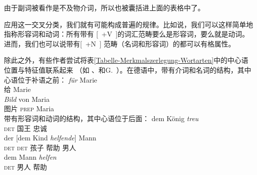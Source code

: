 \noindent
由于副词被看作是不及物介词\label{Seite-Adverbien-PP}，所以也被囊括进上面的表格中了。

应用这一交叉分类，我们就有可能构成普遍的规律。比如说，我们可以这样简单地指称形容词和动词：所有带有 [~+V~]的词汇范畴要么是形容词，要么就是动词。进而，我们也可以说带有[~+N~] 范畴（名词和形容词）的都可以有格属性。

除此之外，有些作者尝试将表\ref{Tabelle-Merkmalszerlegung-Wortarten}中的中心语位置与特征值联系起来
（如 \citealp[]{Grewendorf88a}、\citealp[]{Haftka96a}和G.\ \citealp[]{GMueller2011a}）。在德语中，带有介词和名词的结构，其中心语位于补语之前：
\eal
\ex
\gll \emph{für} Marie\\
	 给 Marie\\
\ex 
\gll \emph{Bild} von Maria\\
	 图片 \textsc{prep} Maria\\
\zl
带有形容词和动词的结构，其中心语位于后面：
\eal
\ex 
\gll dem König \emph{treu}\\
     \textsc{det} 国王 忠诚\\
\ex 
\gll der [dem Kind \emph{helfende}] Mann\\
     \textsc{det} \spacebr\textsc{det} 孩子 帮助 男人\\
\ex 
\gll dem Mann \emph{helfen}\\
      \textsc{det} 男人 帮助\\
